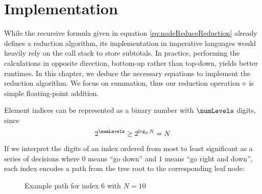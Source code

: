 \chapter{Implementation}
\label{ch:Implementation}

While the recursive formula given in equation \eqref{eq:nodeReduceReduction} already defines a reduction algorithm, its implementation in imperative languages would heavily rely on the call stack to store subtotals.
In practice, performing the calculations in opposite direction, bottom-up rather than top-down, yields better runtimes.
In this chapter, we deduce the necessary equations to implement the reduction algorithm.
We focus on summation, thus our reduction operation $\operatorname{\circ}$ is simple floating-point addition.

Element indices can be represented as a binary number with $\numLevels$ digits, since
\begin{equation}
2^{\numLevels} \geq 2^{\log_2 N} = N
\end{equation}
If we interpret the digits of an index ordered from most to least significant as a series of decisions where $0$ means \enquote{go down}
and $1$ means \enquote{go right and down}, each index encodes a path from the tree root to the corresponding leaf node:

\begin{figure}[H]
\centering
{}
\caption{Example path for index $6$ with $N = 10$}
\label{fig:indexTreePath}
\end{figure}


